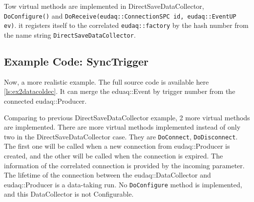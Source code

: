 Tow virtual methods are implemented in DirectSaveDataCollector, \lstinline[style=cpp]{DoConfigure()} and \lstinline[style=cpp]{DoReceive(eudaq::ConnectionSPC id, eudaq::EventUP ev)}. it registers itself to the correlated \lstinline[style=cpp]{eudaq::factory} by the hash number from the name string \lstinline[style=cpp]{DirectSaveDataCollector}. 

\subsection{Example Code: SyncTrigger}\label{sec:ex2datacollector_cc}
Now, a more realistic example. The full source code is available here \autoref{ls:ex2datacoldec}. It can merge the eduaq::Event by trigger number from the connected eudaq::Producer.

Comparing to previous DirectSaveDataCollector example, 2 more virtual methods are implemented. There are more virtual methods implemented instead of only two in the DirectSaveDataCollector case. They are \lstinline[style=cpp]{DoConnect}, \lstinline[style=cpp]{DoDisconnect}. The first one will be called when a new connection from eudaq::Producer is created, and the other will be called  when the connection is expired. The information of the correlated connection is provided by the incoming parameter. The lifetime of the connection between the eudaq::DataCollector and eudaq::Producer is a data-taking run. No \lstinline[style=cpp]{DoConfigure} method is implemented, and this DataCollector is not Configurable.









